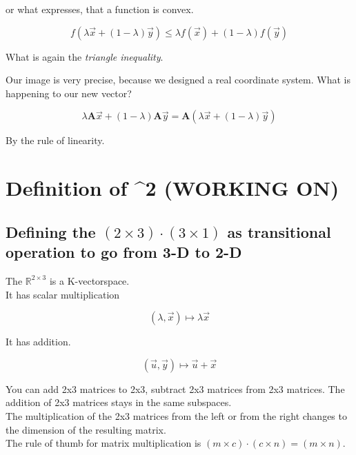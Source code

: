 \documentclass[a4paper]{article}
\begin{document}
or what expresses, that a function is convex.

\begin{displaymath}
f(\lambda\vec{x} + (1-\lambda)\vec{y}) \leq \lambda f(\vec{x}) + (1-\lambda)f(\vec{y})
\end{displaymath}

What is again the \emph{triangle inequality}.

Our image is very precise, because we designed a real coordinate system. What is happening to our new vector? 

\begin{displaymath}
\lambda\boldsymbol{A}\vec{x} + (1-\lambda)\boldsymbol{A}\vec{y} = \boldsymbol{A}(\lambda\vec{x} + (1-\lambda)\vec{y})
\end{displaymath}

By the rule of linearity.


\section{Definition of ^{2} (WORKING ON)}


\subsection{Defining the $(2\times3)\cdot(3\times1)$ as transitional operation to go from 3-D to 2-D}

The $\mathbb{R}^{2\times3}$ is a K-vectorspace. \\

It has scalar multiplication

\begin{displaymath}
(\lambda, \vec{x}) \mapsto \lambda\vec{x} 
\end{displaymath}

It has addition.

\begin{displaymath}
(\vec{u}, \vec{y}) \mapsto \vec{u} + \vec{x}
\end{displaymath}

You can add 2x3 matrices to 2x3, subtract 2x3 matrices from 2x3 matrices.
The addition of 2x3 matrices stays in the same subspaces.\\

The multiplication of the 2x3 matrices from the left or from the right changes to
the dimension of the resulting matrix.\\

The rule of thumb for matrix multiplication is $(m\times c)\cdot(c\times n)=(m\times n)$.\\
\end{document}
